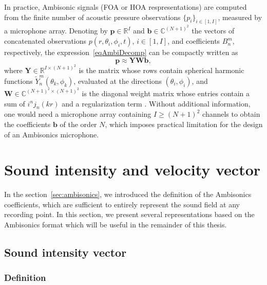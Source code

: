 In practice, Ambisonic signals (FOA or HOA respresentations) are computed from the finite number of acoustic pressure observations $\{p_i\}_{i\in[1,I]}$, measured by a microphone array. Denoting by $\mathbf{p} \in \mathbb{R}^I$ and $\mathbf{b} \in \mathbb{C}^{(N+1)^2}$ the vectors of concatenated observations $p(r,\theta_i,\phi_i,t)$, $i\in[1,I]$, and coefficients $B_n^m$, respectively, the expression~\eqref{eqAmbiDecomp} can be compactly written as
\begin{equation}
    \mathbf{p} \approx \mathbf{Y} \mathbf{W} \mathbf{b},
\end{equation}
where $\mathbf{Y} \in \mathbb{R}^{I \times (N+1)^2}$ is the matrix whose rows contain spherical harmonic functions $\tilde{Y}^m_n(\theta_k,\phi_k)$, evaluated at the directions $(\theta_i,\phi_i)$, and $\mathbf{W} \in \mathbb{C}^{(N+1)^2 \times (N+1)^2}$ is the diagonal weight matrix whose entries contain a sum of $i^n j_n(kr)$ and a regularization term \cite{nicol_sound_2010}. Without additional information, one would need a microphone array containing $I \geq (N+1)^2$ channels to obtain the coefficients $\mathbf{b}$ of the order $N$, which imposes practical limitation for the design of an Ambisonics microphone.

\section{Sound intensity and velocity vector}

In the section~\ref{sec:ambisonics}, we introduced the definition of the Ambisonics coefficients, which are sufficient to entirely represent the sound field at any recording point. In this section, we present several representations based on the Ambisonics format which will be useful in the remainder of this thesis.

\subsection{Sound intensity vector}

\subsubsection{Definition}
\label{ss:pseudointensityVector}

